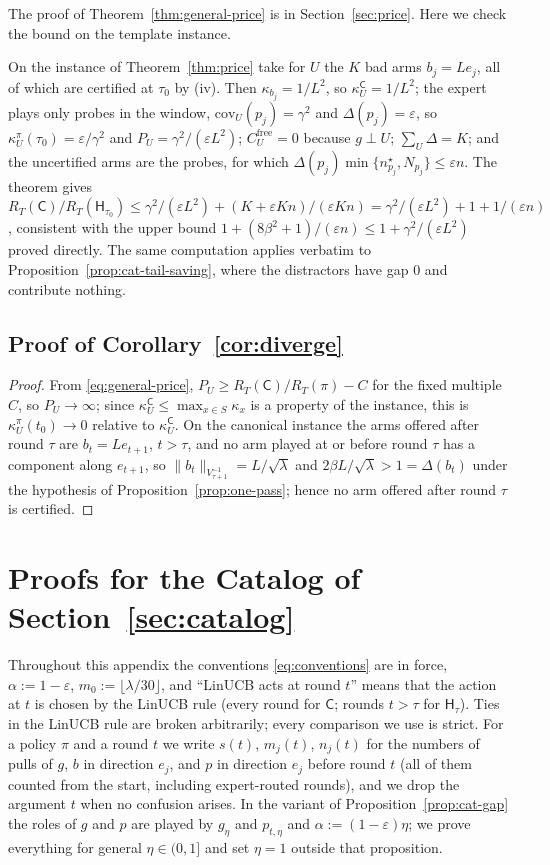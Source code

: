 \documentclass{article}
\theoremstyle{definition}
\theoremstyle{remark}
\newcommand{\eps}{\varepsilon}
\theoremstyle{remark}
\newcommand{\Cold}{\mathsf{C}}
\newcommand{\Hyb}{\mathsf{H}}
\begin{document}
The proof of Theorem~\ref{thm:general-price} is in Section~\ref{sec:price}.
Here we check the bound on the template instance.

On the instance of Theorem~\ref{thm:price} take for $U$ the $K$ bad arms
$b_j=Le_j$, all of which are certified at $\tau_0$ by (iv). Then
$\kappa_{b_j}=1/L^2$, so $\kappa^{\Cold}_U=1/L^2$;
the expert plays only probes in the window, $\mathrm{cov}_U(p_j)=\gamma^2$ and
$\Delta(p_j)=\eps$, so $\kappa^\pi_U(\tau_0)=\eps/\gamma^2$ and $P_U=\gamma^2/(\eps L^2)$;
$C^{\mathrm{free}}_U=0$ because $g\perp U$; $\sum_U\Delta=K$; and the
uncertified arms are the probes, for which
$\Delta(p_j)\min\{n^\star_{p_j},N_{p_j}\}\le\eps n$. The theorem gives
$R_T(\Cold)/R_T(\Hyb_{\tau_0})\le \gamma^2/(\eps L^2)+(K+\eps Kn)/(\eps Kn)=\gamma^2/(\eps L^2)+1+1/(\eps n)$,
consistent with the upper bound $1+(8\beta^2+1)/(\eps n)\le1+\gamma^2/(\eps L^2)$
proved directly. The same computation applies verbatim to
Proposition~\ref{prop:cat-tail-saving}, where the distractors have gap $0$
and contribute nothing.

\subsection{Proof of Corollary~\ref{cor:diverge}}
\label{app:proof-diverge}

\begin{proof}
From \eqref{eq:general-price}, $P_U\ge R_T(\Cold)/R_T(\pi)-C$ for the
fixed multiple $C$, so $P_U\to\infty$; since $\kappa^{\Cold}_U\le\max_{x\in S}\kappa_x$ is a
property of the instance, this is $\kappa^\pi_U(t_0)\to0$ relative to $\kappa^{\Cold}_U$.
On the canonical instance the arms offered after round $\tau$ are
$b_t=Le_{t+1}$, $t>\tau$, and no arm played at or before round $\tau$ has a
component along $e_{t+1}$, so $\|b_t\|_{V_{\tau+1}^{-1}}=L/\sqrt\lambda$ and
$2\beta L/\sqrt\lambda>1=\Delta(b_t)$ under the hypothesis of
Proposition~\ref{prop:one-pass}; hence no arm offered after round $\tau$ is certified.
\end{proof}

\section{Proofs for the Catalog of Section~\ref{sec:catalog}}
\label{app:catalog}

Throughout this appendix the conventions \eqref{eq:conventions} are in force,
$\alpha:=1-\eps$, $m_0:=\lfloor\lambda/30\rfloor$, and ``LinUCB acts at round
$t$'' means that the action at $t$ is chosen by the LinUCB rule (every round
for $\Cold$; rounds $t>\tau$ for $\Hyb_\tau$). Ties in the LinUCB rule are
broken arbitrarily; every comparison we use is strict. For a policy $\pi$ and
a round $t$ we write $s(t)$, $m_j(t)$, $n_j(t)$ for the numbers of pulls of
$g$, $b$ in direction $e_j$, and $p$ in direction $e_j$ before round $t$
(all of them counted from the start, including expert-routed rounds), and we
drop the argument $t$ when no confusion arises. In the variant of
Proposition~\ref{prop:cat-gap} the roles of $g$ and $p$ are played by
$g_\eta$ and $p_{t,\eta}$ and $\alpha:=(1-\eps)\eta$; we prove everything for
general $\eta\in(0,1]$ and set $\eta=1$ outside that proposition.
\end{document}
